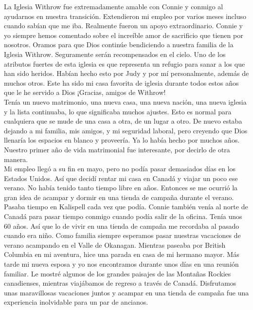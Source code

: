 \documentclass[twoside, 12pt]{book}
\begin{document}
La Iglesia Withrow fue extremadamente amable con Connie y conmigo al ayudarnos en nuestra transición. Extendieron mi empleo por varios meses incluso cuando sabían que me iba. Realmente fueron un apoyo extraordinario. Connie y yo siempre hemos comentado sobre el increíble amor de sacrificio que tienen por nosotros. Oramos para que Dios continúe bendiciendo a nuestra familia de la Iglesia Withrow. Seguramente serán recompensados en el cielo. Uno de los atributos fuertes de esta iglesia es que representa un refugio para sanar a los que han sido heridos. Habían hecho esto por Judy y por mí personalmente, además de muchos otros. Este ha sido mi casa favorita de iglesia durante todos estos años que le he servido a Dios ¡Gracias, amigos de Withrow!\\

Tenía un nuevo matrimonio, una nueva casa, una nueva nación, una nueva iglesia y la lista continuaba, lo que significaba muchos ajustes.  Esto es normal para cualquiera que se mude de una casa a otra, de un lugar a otro.  De nuevo estaba dejando a mi familia, mis amigos, y mi seguridad laboral, pero creyendo que Dios llenaría los espacios en blanco y proveería. Ya lo había hecho por muchos años. Nuestro primer año de vida matrimonial fue interesante, por decirlo de otra manera.\\

Mi empleo llegó a su fin en mayo, pero no podía pasar demasiados días en los Estados Unidos. Así que decidí rentar mi casa en Canadá y viajar un poco ese verano. No había tenido tanto tiempo libre en años. Entonces se me ocurrió la gran idea de acampar y dormir en una tienda de campaña durante el verano. Pasaba tiempo en Kalispell cada vez que podía. Connie también venía al norte de Canadá para pasar tiempo conmigo cuando podía salir de la oficina. Tenía unos 60 años. Así que lo de vivir en una tienda de campaña me recordaba al pasado cuando era niño. Como familia siempre esperamos pasar nuestras vacaciones de verano acampando en el Valle de Okanagan. Mientras paseaba por British Columbia en mi aventura, hice una parada en casa de mi hermano mayor. Más tarde mi nueva esposa y yo nos encontramos durante unos días en una reunión familiar. Le mostré algunos de los grandes paisajes de las Montañas Rockies canadienses, mientras viajábamos de regreso a través de Canadá. Disfrutamos unas maravillosas vacaciones juntos y acampar en una tienda de campaña fue una experiencia inolvidable para un par de ancianos.\\
\end{document}
